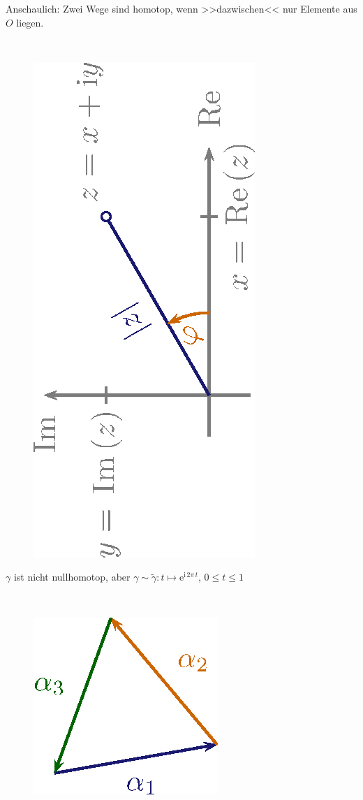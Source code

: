 \documentclass[a4paper,10pt]{scrbook}
\begin{document}
\begin{example}
\begin{enum-arab}
\begin{enum-alph}
      Anschaulich: Zwei Wege sind homotop, wenn >>dazwischen<< nur Elemente aus $O$ liegen.

      \item ~
      \begin{figure}[H]
        \centering
        \includegraphics[scale=0.2]{images/ana3-tmp-11}
      \end{figure}
      $\gamma$ ist nicht nullhomotop, aber $\gamma \sim \widetilde{\gamma} : t \mapsto \mathrm{e}^{\mathrm{i} \, 2\pi \, t}$, $0 \leq t \leq 1$

      \item ~
      \begin{figure}[H]
        \centering
        \includegraphics[scale=0.2]{images/ana3-tmp-12}
      \end{figure}


\end{enum-alph}
\end{enum-arab}
\end{example}
\end{document}
